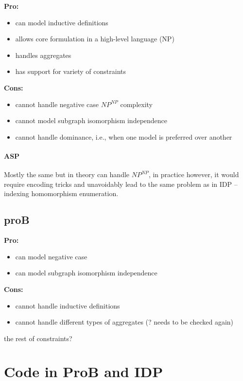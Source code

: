 \documentclass{article}
\theoremstyle{definition}
\begin{document}
\textbf{Pro:}
\begin{itemize}
  \item can model inductive definitions
  \item allows core formulation in a high-level language (NP)
  \item handles aggregates
  \item has support for variety of constraints
\end{itemize}
\textbf{Cons:}
\begin{itemize}
  \item cannot handle negative case $\textit{NP}^\textit{NP}$ complexity
  \item cannot model subgraph isomorphism independence
  \item cannot handle dominance, i.e., when one model is preferred over another 
\end{itemize}

\paragraph{ASP}
Mostly the same but in theory can handle $\textit{NP}^\textit{NP}$, in practice however, it would require encoding tricks and unavoidably lead to the same problem as in IDP -- indexing homomorphism enumeration.

\subsection{proB}
\textbf{Pro:}
\begin{itemize}
  \item can model negative case
  \item can model subgraph isomorphism independence
\end{itemize}
\textbf{Cons:}
\begin{itemize}
  \item cannot handle inductive definitions
  \item cannot handle different types of aggregates (? needs to be checked again)
\end{itemize}

the rest of constraints? 

\section{Code in ProB and IDP}

\pagebreak

\end{document}
